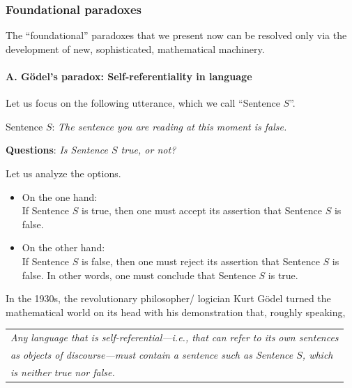 \subsubsection{Foundational paradoxes}
\label{sec:paradoxes}

The ``foundational'' paradoxes that we present now can be resolved
only via the development of new, sophisticated, mathematical
machinery.

\paragraph{\small\sf A.  G\"{o}del's paradox: Self-referentiality in language}

Let us focus on the following utterance, which we call ``Sentence $S$''.

Sentence $S$: {\em The sentence you are reading at this moment is false.}

\noindent
{\bf Questions}: {\it Is Sentence $S$ true, or not?}

\noindent
Let us analyze the options.
\begin{itemize}
\item
On the one hand: \\
If Sentence $S$ is true, then one must accept its assertion that
Sentence $S$ is false.

\item
On the other hand: \\
If Sentence $S$ is false, then one must reject its assertion that
Sentence $S$ is false.  In other words, one must conclude that
Sentence $S$ is true.
\end{itemize}

\noindent
In the 1930s, the revolutionary philosopher/ logician Kurt G\"{o}del
 turned the mathematical world on its head with
his demonstration that, roughly speaking,

\begin{tabular}{l}
{\em Any language that is self-referential---i.e., that can refer to
  its own sentences} \\
{\em as objects of discourse---must contain a sentence such as
  Sentence $S$, which} \\
{\em is neither true nor false.}  \cite{Goedel31}
\end{tabular}

